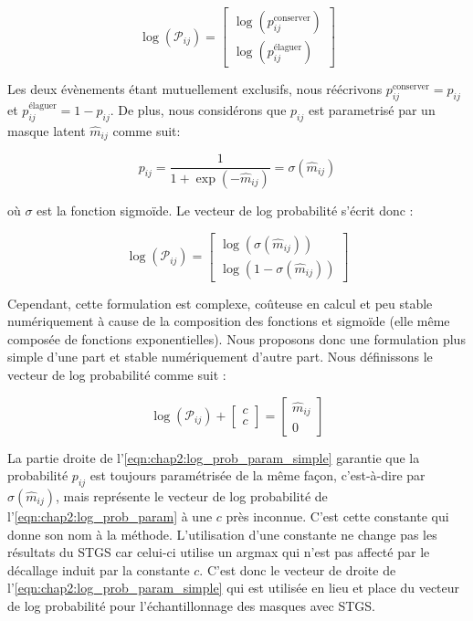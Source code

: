 \begin{equation}
  \label{eqn:chap2:log_prob}
  \log(\mathcal{P}_{ij}) = \begin{bmatrix}
    \log(p^\text{conserver}_{ij}) \\
    \log(p^\text{élaguer}_{ij})
  \end{bmatrix}
\end{equation}

\noindent Les deux évènements étant mutuellement exclusifs, nous réécrivons
$p^\text{conserver}_{ij} = p_{ij}$ et $p^\text{élaguer}_{ij} = 1 - p_{ij}$. De
plus, nous considérons que $p_{ij}$ est parametrisé par un masque latent
$\hat{m}_{ij}$ comme suit:

\begin{equation}
  \label{eqn:chap2:prob_param}
  p_{ij} = \frac{1}{1 + \exp(-\hat{m}_{ij})} = \sigma(\hat{m}_{ij})
\end{equation}

\noindent où $\sigma$ est la fonction sigmoïde. Le vecteur de log probabilité
s'écrit donc :

\begin{equation}
  \label{eqn:chap2:log_prob_param}
  \log(\mathcal{P}_{ij}) = \begin{bmatrix}
    \log(\sigma(\hat{m}_{ij})) \\
    \log(1 - \sigma(\hat{m}_{ij}))
  \end{bmatrix}
\end{equation}

Cependant, cette formulation est complexe, coûteuse en calcul et peu stable
numériquement à cause de la composition des fonctions et sigmoïde (elle même
composée de fonctions exponentielles). Nous proposons donc une formulation plus
simple d'une part et stable numériquement d'autre part. Nous définissons le
vecteur de log probabilité comme suit :

\begin{equation}
  \label{eqn:chap2:log_prob_param_simple}
  \log(\mathcal{P}_{ij}) +\begin{bmatrix}
    c \\
    c
  \end{bmatrix} = \begin{bmatrix}
    \hat{m}_{ij} \\
    0
  \end{bmatrix}
\end{equation}

\noindent La partie droite de l'\cref{eqn:chap2:log_prob_param_simple} garantie
que la probabilité $p_{ij}$ est toujours paramétrisée de la même façon,
c'est-à-dire par $\sigma(\hat{m}_{ij})$, mais représente le vecteur de log
probabilité de l'\cref{eqn:chap2:log_prob_param} à une $c$ près inconnue. C'est
cette constante qui donne son nom à la méthode. L'utilisation d'une constante ne
change pas les résultats du \ac{STGS} car celui-ci utilise un argmax qui n'est
pas affecté par le décallage induit par la constante $c$. C'est donc le vecteur
de droite de l'\cref{eqn:chap2:log_prob_param_simple} qui est utilisée en lieu
et place du vecteur de log probabilité pour l'échantillonnage des masques avec
\ac{STGS}.\\

